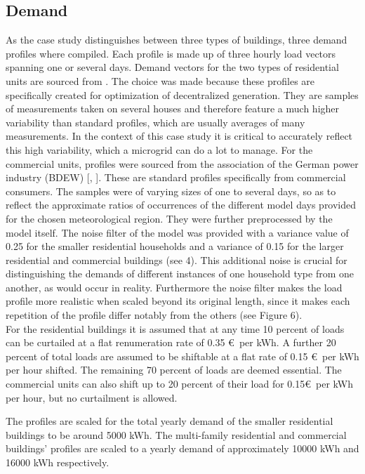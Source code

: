 \documentclass[
	11pt,								%
	DIV10,								%
	a4paper,         					%
	oneside,							%
	headheight=20pt,					%
	footheight=20pt,					%
    parskip=full,						%
    listof=totoc,						%
	bibliography=totoc,					%
	index=totoc,						%
]{scrartcl}
\begin{document}
\subsection{Demand}
As the case study distinguishes between three types of buildings, three demand profiles where compiled. Each profile is made up of three hourly load vectors spanning one or several days. Demand vectors for the two types of residential units are sourced from \cite{ReferenzlastprofileUndMehrfamilien2008}. The choice was made because these profiles are specifically created for optimization of decentralized generation. They are samples of measurements taken on several houses and therefore feature a much higher variability than standard profiles, which are usually averages of many measurements. In the context of this case study it is critical to accurately reflect this high variability, which a microgrid can do a lot to manage. For the commercial units, profiles were sourced from the association of the German power industry (BDEW) [\cite{fuenfgeldAnwendungRepraesentativenVDEWLastprofile2000}, \cite{StandardlastprofileStrom2017}]. These are standard profiles specifically from commercial consumers. The samples were of varying sizes of one to several days, so as to reflect the approximate ratios of occurrences of the different model days provided for the chosen meteorological region. They were further preprocessed by the model itself. The noise filter of the model was provided with a variance value of 0.25 for the smaller residential households and a variance of 0.15 for the larger residential and commercial buildings (see 4). This additional noise is crucial for distinguishing the demands of different instances of one household type from one another, as would occur in reality. Furthermore the noise filter makes the load profile more realistic when scaled beyond its original length, since it makes each repetition of the profile differ notably from the others (see Figure 6).
\\
For the residential buildings it is assumed that at any time 10 percent of loads can be curtailed at a flat renumeration rate of 0.35 \euro\ per kWh. A further 20 percent of total loads are assumed to be shiftable at a flat rate of 0.15 \euro\ per kWh per hour shifted. The remaining 70 percent of loads are deemed essential. The commercial units can also shift up to 20 percent of their load for 0.15\euro\ per kWh per hour, but no curtailment is allowed.

The profiles are scaled for the total yearly demand of the smaller residential buildings to be around 5000 kWh. The multi-family residential and commercial buildings' profiles are scaled to a yearly demand of approximately 10000 kWh and 16000 kWh respectively. 
\end{document}
